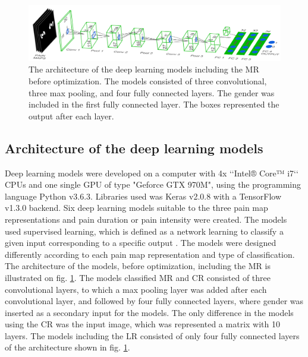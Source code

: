 \begin{figure} [t!]
\centering
\includegraphics[width=1\textwidth]{Figures/models}
\caption{The architecture of the deep learning models including the MR before optimization. The models consisted of three convolutional, three max pooling, and four fully connected layers. The gender was included in the first fully connected layer. The boxes represented the output after each layer.}
\label{fig:models}
\end{figure}

\subsection{Architecture of the deep learning models}
Deep learning models were developed on a computer with 4x ‘‘Intel® Core™ i7‘‘ CPUs and one single GPU of type "Geforce GTX 970M", using the programming language Python v3.6.3. Libraries used was Keras v2.0.8 with a TensorFlow v1.3.0 backend.\newline
\noindent
Six deep learning models suitable to the three pain map representations and pain duration or pain intensity were created. The models used supervised learning, which is defined as a network learning to classify a given input corresponding to a specific output \citep{Goodfellow2016}. The models were designed differently according to each pain map representation and type of classification. The architecture of the models, before optimization, including the MR is illustrated on fig. \ref{fig:models}. The models classified MR and CR consisted of three convolutional layers, to which a max pooling layer was added after each convolutional layer, and followed by four fully connected layers, where gender was inserted as a secondary input for the models. The only difference in the models using the CR was the input image, which was represented a matrix with 10 layers. 
The models including the LR consisted of only four fully connected layers of the architecture shown in fig. \ref{fig:models}. 

